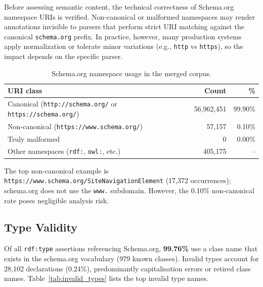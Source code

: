 \documentclass[11pt,a4paper]{article}
\begin{document}
Before assessing semantic content, the technical correctness of Schema.org
namespace URIs is verified.
Non-canonical or malformed namespaces may render annotations invisible to
parsers that perform strict URI matching against the canonical
\texttt{schema.org} prefix. In practice, however, many production systems
apply normalization or tolerate minor variations (e.g., \texttt{http} vs
\texttt{https}), so the impact depends on the specific parser.

\begin{table}[H]
\centering
\caption{Schema.org namespace usage in the merged corpus.}
\label{tab:namespace}
\begin{tabular}{lrr}
\toprule
\textbf{URI class} & \textbf{Count} & \textbf{\%} \\
\midrule
Canonical (\texttt{http://schema.org/} or \texttt{https://schema.org/}) & 56{,}962{,}451 & 99.90\% \\
Non-canonical (\texttt{https://www.schema.org/})                         &     57{,}157   &  0.10\% \\
Truly malformed                                                           &           0    &  0.00\% \\
Other namespaces (\texttt{rdf:}, \texttt{owl:}, etc.)                    &    405{,}175   &    -- \\
\bottomrule
\end{tabular}
\end{table}

The top non-canonical example is
\texttt{https://www.schema.org/SiteNavigationElement} (17{,}372 occurrences);
schema.org does not use the \texttt{www.} subdomain.
However, the 0.10\% non-canonical rate poses negligible analysis risk.

\subsection{Type Validity}

Of all \texttt{rdf:type} assertions referencing Schema.org, \textbf{99.76\%}
use a class name that exists in the schema.org vocabulary (979 known classes).
Invalid types account for 28{,}102 declarations (0.24\%), predominantly
capitalisation errors or retired class names.
Table~\ref{tab:invalid_types} lists the top invalid type names.
\end{document}
